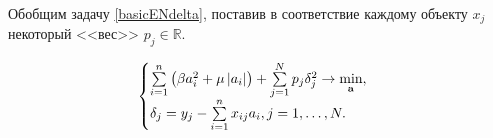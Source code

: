 Обобщим задачу \ref{basicENdelta}, поставив в соответствие каждому объекту $x_j$ некоторый <<вес>> $p_j\in \mathbb R$.

\begin{equation}
	\label{weighedENdelta}
	\begin{cases}
		\sum\limits_{i=1}^n\left(\beta a_i^2 + \mu \left|a_i\right|\right) 
	+ \sum\limits_{j=1}^N p_j\delta_j^2 \to \mathop{\mbox{min}}\limits_{\boldsymbol{\mathbf{a}}}, \\
	\delta_j = y_j - \sum\limits_{i=1}^nx_{ij}a_i, j=1,\ldots,N. 
	\end{cases}
\end{equation}